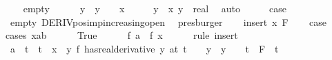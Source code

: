 \begin{isabellebody}
\ \ \isamarkupfalse%
\ empty\isanewline
\ \ \isamarkupfalse%
\ {\isachardoublequoteopen}{\isacharparenleft}{\kern0pt}{}\ {\isasymle}\ y\ {\isasymand}\ {\isacharparenleft}{\kern0pt}y\ {\isacharequal}{\kern0pt}\ {}\ {\isasymlongrightarrow}\ x\ {\isasymin}\ {\isacharbraceleft}{\kern0pt}{\isacharbraceright}{\kern0pt}{\isacharparenright}{\kern0pt}{\isacharparenright}{\kern0pt}\ {\isacharequal}{\kern0pt}\ {\isacharparenleft}{\kern0pt}{}\ {\isacharless}{\kern0pt}\ y{\isacharparenright}{\kern0pt}{\isachardoublequoteclose}\ \ x\ y\ {\isacharcolon}{\kern0pt}{\isacharcolon}{\kern0pt}\ real\ \isamarkupfalse%
\ auto\isanewline
\ \ \isamarkupfalse%
\ \isamarkupfalse%
\ {\isacharquery}{\kern0pt}case\ \isamarkupfalse%
\ empty\ DERIV{\isacharunderscore}{\kern0pt}pos{\isacharunderscore}{\kern0pt}imp{\isacharunderscore}{\kern0pt}increasing{\isacharunderscore}{\kern0pt}open\ \isamarkupfalse%
\ presburger\isanewline
{}\isamarkupfalse%
\isanewline
\ \ \isamarkupfalse%
\ {\isacharparenleft}{\kern0pt}insert\ x\ F{\isacharparenright}{\kern0pt}\isanewline
\ \ \isamarkupfalse%
\ {\isacharquery}{\kern0pt}case\isanewline
\ \ \isamarkupfalse%
{\isacharparenleft}{\kern0pt}cases\ {\isachardoublequoteopen}x{\isasymin}{\isacharbraceleft}{\kern0pt}a{\isacharless}{\kern0pt}{\isachardot}{\kern0pt}{\isachardot}{\kern0pt}{\isacharless}{\kern0pt}b{\isacharbraceright}{\kern0pt}{\isachardoublequoteclose}{\isacharparenright}{\kern0pt}\isanewline
\ \ \ \ \isamarkupfalse%
\ True\isanewline
\ \ \ \ \isamarkupfalse%
\ {\isachardoublequoteopen}f\ a\ {\isacharless}{\kern0pt}\ f\ x{\isachardoublequoteclose}\isanewline
\ \ \ \ \isamarkupfalse%
\ {\isacharparenleft}{\kern0pt}rule\ insert{\isacharparenleft}{\kern0pt}{}{\isacharparenright}{\kern0pt}{\isacharparenright}{\kern0pt}\isanewline
\ \ \ \ \ \ \isamarkupfalse%
\ {\isachardoublequoteopen}a\ {\isacharless}{\kern0pt}\ t\ {\isasymLongrightarrow}\ t\ {\isacharless}{\kern0pt}\ x\ {\isasymLongrightarrow}\ {\isasymexists}y{\isachardot}{\kern0pt}\ {\isacharparenleft}{\kern0pt}f\ has{\isacharunderscore}{\kern0pt}real{\isacharunderscore}{\kern0pt}derivative\ y{\isacharparenright}{\kern0pt}\ {\isacharparenleft}{\kern0pt}at\ t{\isacharparenright}{\kern0pt}\ {\isasymand}\ {}\ {\isasymle}\ y\ {\isasymand}\ {\isacharparenleft}{\kern0pt}y\ {\isacharequal}{\kern0pt}\ {}\ {\isasymlongrightarrow}\ t\ {\isasymin}\ F{\isacharparenright}{\kern0pt}{\isachardoublequoteclose}\ \ t\isanewline

\end{isabellebody}
